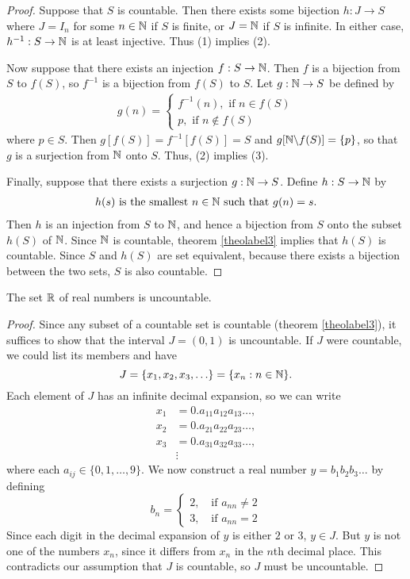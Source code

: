 \begin{proof}
	Suppose that $S$ is countable. Then there exists some bijection $h:J\rightarrow S$ where $J=I_n$ for some $n\in \mathbb{N}$ if $S$ is finite, or $J=\mathbb{N}$ if $S$ is infinite. In either case, $h^{-1}:S\rightarrow \mathbb{N}$ is at least injective. Thus (1) implies (2). 
	
	Now suppose that there exists an injection $f:S\rightarrow \mathbb{N}$. Then $f$ is a bijection from $S$ to $f(S)$, so $f^{-1}$ is a bijection from $f(S)$ to $S$. Let $g:\mathbb{N}\rightarrow S$ be defined by
	\begin{align*}
		g(n) = \begin{cases}
			f^{-1}(n), \text{ if $n\in f(S)$} \\
			p, \text{ if $n\notin f(S)$}
		\end{cases}
	\end{align*}
	where $p\in S$. Then $g[f(S)]=f^{-1}[f(S)]=S$ and $g[\mathbb{N}\backslash f(S)]=\{p\}$, so that $g$ is a surjection from $\mathbb{N}$ onto $S$. Thus, (2) implies (3).
	
	Finally, suppose that there exists a surjection $g:\mathbb{N}\rightarrow S$. Define $h:S\rightarrow \mathbb{N}$ by
	\begin{align*}
		h(s) \text{ is the smallest $n\in \mathbb{N}$ such that $g(n)=s$.}
	\end{align*}
	Then $h$ is an injection from $S$ to $\mathbb{N}$, and hence a bijection from $S$ onto the subset $h(S)$ of $\mathbb{N}$. Since $\mathbb{N}$ is countable, theorem \ref{theolabel3} implies that $h(S)$ is countable. Since $S$ and $h(S)$ are set equivalent, because there exists a bijection between the two sets, $S$ is also countable.
\end{proof}

\begin{theorem}
	The set $\mathbb{R}$ of real numbers is uncountable.
\end{theorem}

\begin{proof}
	Since any subset of a countable set is countable (theorem \ref{theolabel3}), it suffices to show that the interval $J=(0,1)$ is uncountable. If $J$ were countable, we could list its members and have 
	$$J=\{x_1,x_2,x_3,\hdots\}=\{x_n:n\in\mathbb{N}\}.$$
	Each element of $J$ has an infinite decimal expansion, so we can write
	\begin{align*}
		x_1 &= 0.a_{11}a_{12}a_{13}\hdots, \\
		x_2 &= 0.a_{21}a_{22}a_{23}\hdots, \\
		x_3 &= 0.a_{31}a_{32}a_{33}\hdots, \\
		&\vdots
	\end{align*}
	where each $a_{ij}\in \{0,1,\hdots,9\}$. We now construct a real number $y=b_1b_2b_3\hdots$ by defining
	$$b_n=\begin{cases}
		2, \quad \text{if $a_{nn}\neq 2$} \\
		3, \quad \text{if $a_{nn}=2$}
	\end{cases}$$
	Since each digit in the decimal expansion of $y$ is either $2$ or $3$, $y\in J$. But $y$ is not one of the numbers $x_n$, since it differs from $x_n$ in the $n$th decimal place. This contradicts our assumption that $J$ is countable, so $J$ must be uncountable.
\end{proof}

